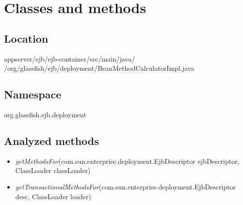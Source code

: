 \section{Classes and methods}
\subsection{Location}
appserver/ejb/ejb-container/src/main/java/\\/org/glassfish/ejb/deployment/BeanMethodCalculatorImpl.java
\subsection{Namespace}
org.glassfish.ejb.deployment

\subsection{Analyzed methods}
\begin{itemize}
	\item \textit{getMethodsFor}(com.sun.enterprise.deployment.EjbDescriptor ejbDescriptor, ClassLoader classLoader)
	\item \textit{getTransactionalMethodsFor}(com.sun.enterprise.deployment.EjbDescriptor desc, ClassLoader loader)
\end{itemize}

